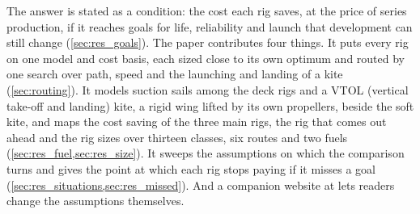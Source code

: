 The answer is stated as a condition: the cost each rig saves, at the price of series production, if it reaches goals for life, reliability and launch that development can still change (\cref{sec:res_goals}). The paper contributes four things. It puts every rig on one model and cost basis, each sized close to its own optimum and routed by one search over path, speed and the launching and landing of a kite (\cref{sec:routing}). It models suction sails among the deck rigs and a VTOL (vertical take-off and landing) kite, a rigid wing lifted by its own propellers, beside the soft kite, and maps the cost saving of the three main rigs, the rig that comes out ahead and the rig sizes over thirteen classes, six routes and two fuels (\cref{sec:res_fuel,sec:res_size}). It sweeps the assumptions on which the comparison turns and gives the point at which each rig stops paying if it misses a goal (\cref{sec:res_situations,sec:res_missed}). And a companion website at \urlof{\website} lets readers change the assumptions themselves.
